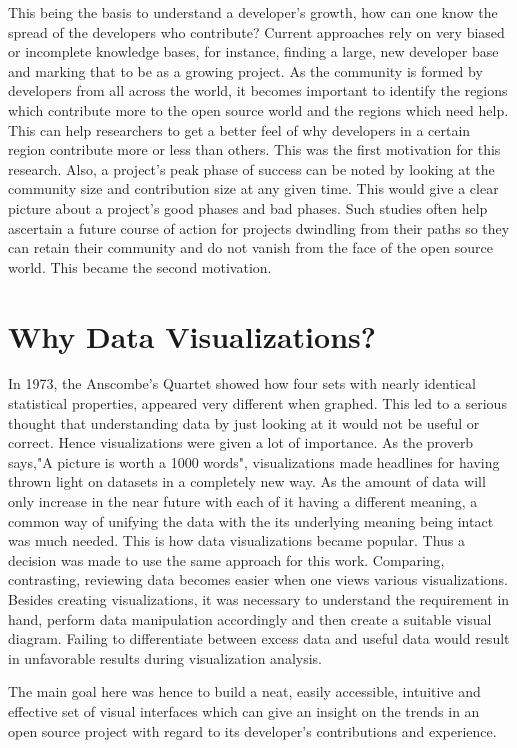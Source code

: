 \documentclass[seploa]{beavtex}
\begin{document}
This being the basis to understand a developer's growth, how can one know the spread of the developers who contribute? Current approaches rely on very biased or incomplete knowledge bases, for instance, finding a large, new developer base and marking that to be as a growing project\cite{igor2014}. As the community is formed by developers from all across the world, it becomes important to identify the regions which contribute more to the open source world and the regions which need help. This can help researchers to get a better feel of why developers in a certain region contribute more or less than others. This was the first motivation for this research. Also, a project's peak phase of success can be noted by looking at the community size and contribution size at any given time. This would give a clear picture about a project's good phases and bad phases. Such studies often help ascertain a future course of action for projects dwindling from their paths so they can retain their community and do not vanish from the face of the open source world. This became the second motivation.

\section{Why Data Visualizations?}
In 1973, the Anscombe's Quartet showed how four sets with nearly identical statistical properties, appeared very different when graphed\cite{wiki}. This led to a serious thought that understanding data by just looking at it would not be useful or correct. Hence visualizations were given a lot of importance. As the proverb says,"A picture is worth a 1000 words", visualizations made headlines for having thrown light on datasets in a completely new way. As the amount of data will only increase in the near future with each of it having a different meaning, a common way of unifying the data with the its underlying meaning being intact was much needed. This is how data visualizations became popular. Thus a decision was made to use the same approach for this work. Comparing, contrasting, reviewing data becomes easier when one views various visualizations. Besides creating visualizations, it was necessary to understand the requirement in hand, perform data manipulation accordingly and then create a suitable visual diagram. Failing to differentiate between excess data and useful data would result in unfavorable results during visualization analysis.

The main goal here was hence to build a neat, easily accessible, intuitive and effective set of visual interfaces which can give an insight on the trends in an open source project with regard to its developer's contributions and experience.
\end{document}
